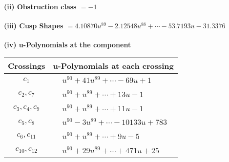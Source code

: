 \documentclass[1p]{elsarticle_modified}
\theoremstyle{definition}
\begin{document}
\flushleft \textbf{(ii) Obstruction class $= -1$}\\~\\
\flushleft \textbf{(iii) Cusp Shapes $= 4.10870 u^{89}-2.12548 u^{88}+\cdots-53.7193 u-31.3376$}\\~\\
\newpage\renewcommand{\arraystretch}{1}
\flushleft \textbf{(iv) u-Polynomials at the component}\newline \\
\begin{tabular}{m{50pt}|m{274pt}}
Crossings & \hspace{64pt}u-Polynomials at each crossing \\
\hline $$\begin{aligned}c_{1}\end{aligned}$$&$\begin{aligned}
&u^{90}+41 u^{89}+\cdots-69 u+1
\end{aligned}$\\
\hline $$\begin{aligned}c_{2},c_{7}\end{aligned}$$&$\begin{aligned}
&u^{90}+u^{89}+\cdots+13 u-1
\end{aligned}$\\
\hline $$\begin{aligned}c_{3},c_{4},c_{9}\end{aligned}$$&$\begin{aligned}
&u^{90}+u^{89}+\cdots+11 u-1
\end{aligned}$\\
\hline $$\begin{aligned}c_{5},c_{8}\end{aligned}$$&$\begin{aligned}
&u^{90}-3 u^{89}+\cdots-10133 u+783
\end{aligned}$\\
\hline $$\begin{aligned}c_{6},c_{11}\end{aligned}$$&$\begin{aligned}
&u^{90}+u^{89}+\cdots+9 u-5
\end{aligned}$\\
\hline $$\begin{aligned}c_{10},c_{12}\end{aligned}$$&$\begin{aligned}
&u^{90}+29 u^{89}+\cdots+471 u+25
\end{aligned}$\\
\hline
\end{tabular}\\~\\
\end{document}
